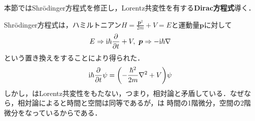 \documentclass{report}
\begin{document}
本節ではShrödinger方程式を修正し，Lorentz共変性を有する\textbf{Dirac方程式}導く．

Shrödinger方程式は，ハミルトニアン$H=\frac{\bm{p}^2}{2m} + V=E$と運動量$\bm{p}$に対して
\begin{align}
  E \Rightarrow \mathrm{i}\hbar\frac{\partial}{\partial t} + V,\ \bm{p} \Rightarrow -\mathrm{i}\hbar \nabla 
\end{align}
という置き換えをすることにより得られた．
\begin{align}
  \mathrm{i}\hbar \frac{\partial}{\partial t}\psi = \qty(-\frac{\hbar^2}{2m}\nabla^2 + V)\psi   \label{TDSE}
\end{align}
しかし，はLorentz共変性をもたない，つまり，相対論と矛盾している．なぜなら，相対論によると時間と空間は同等であるが，は
時間の1階微分，空間の2階微分をなっているからである．
\end{document}
